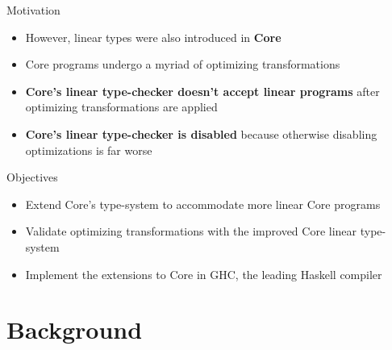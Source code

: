 \documentclass[14pt,aspectratio=169]{beamer}
\begin{document}
\begin{frame}{Motivation}
\begin{itemize}
    \item<1-> However, linear types were also introduced in \textbf<1>{Core}
    \item<2-> Core programs undergo a myriad of optimizing transformations
    \item<3-> \textbf<3>{Core's linear type-checker doesn't accept linear
        programs} after optimizing transformations are applied
    \item<4-> \textbf<4>{Core's linear type-checker is disabled} because
        otherwise disabling optimizations is far worse
\end{itemize}
\end{frame}

\begin{frame}{Objectives}
\begin{itemize}
    \item<1-> Extend Core's type-system to accommodate more linear Core programs
    \item<2-> Validate optimizing transformations with the improved Core linear type-system
    \item<3-> Implement the extensions to Core in GHC, the leading Haskell
        compiler
\end{itemize}
\end{frame}

\section{Background}

\begin{frame}{}
\end{frame}
\end{document}
